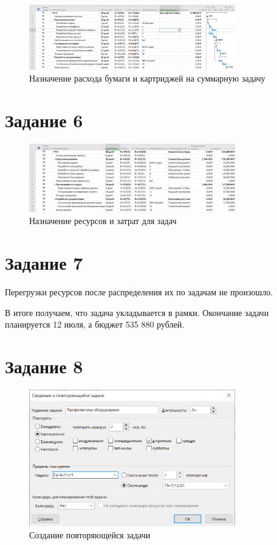 \begin{figure}[H]
    \centering
    \includegraphics[width=0.8\textwidth]{img/content/task_05_2.png}
    \caption{Назначение расхода бумаги и картриджей на суммарную задачу}
    \label{fig:task_05_2}
\end{figure}

\section{Задание 6}

\begin{figure}[H]
    \centering
    \includegraphics[width=0.8\textwidth]{img/content/task_06.png}
    \caption{Назначение ресурсов и затрат для задач}
    \label{fig:}
\end{figure}

\section{Задание 7}

Перегрузки ресурсов после распределения их по задачам не произошло.

В итоге получаем, что задача укладывается в рамки. Окончание задачи планируется 12 июля, а бюджет 535 880 рублей.

\section{Задание 8}

\begin{figure}[H]
    \centering
    \includegraphics[width=0.8\textwidth]{img/content/task_08_1.png}
    \caption{Создание повторяющейся задачи}
    \label{fig:task_08_1}
\end{figure}

